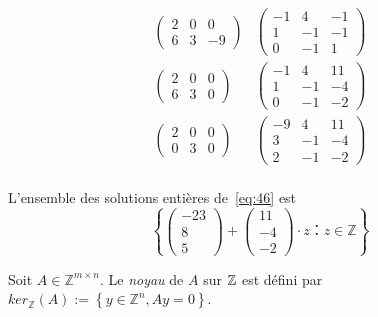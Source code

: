 \begin{example}
\begin{equation}
\begin{array}{cc}
\left(\begin{matrix}2 & 0 & 0\\6 & 3 & -9\end{matrix}\right) &
\left(\begin{matrix}-1 & 4 & -1\\1 & -1 & -1\\0 & -1 & 1\end{matrix}\right)\\

\left(\begin{matrix}2 & 0 & 0\\6 & 3 & 0\end{matrix}\right) &
\left(\begin{matrix}-1 & 4 & 11\\1 & -1 & -4\\0 & -1 & -2\end{matrix}\right)\\


\left(\begin{matrix}2 & 0 & 0\\0 & 3 & 0\end{matrix}\right) &
\left(\begin{matrix}-9 & 4 & 11\\3 & -1 & -4\\2 & -1 & -2\end{matrix}\right)\\
      \end{array}      
    \end{equation}

    L'ensemble des  solutions entières de~\eqref{eq:46} est 
    \begin{displaymath}
      \left\{ \left(\begin{matrix}-23\\8\\5\end{matrix}\right) + \left(\begin{matrix}11\\-4\\-2\end{matrix}\right) ⋅z ： z ∈ℤ\right\}
    \end{displaymath}
    
  \end{example}
  
  \begin{definition}
    \label{def:62}
   Soit $A \in \mathbb{Z}^{m \times n}$. Le \emph{noyau} de $A$ sur $\mathbb{Z}$ est défini par $ker_{\mathbb{Z}}(A) := \left\{ y \in \mathbb{Z}^n, Ay=0 \right\}  $.
  \end{definition}
  
